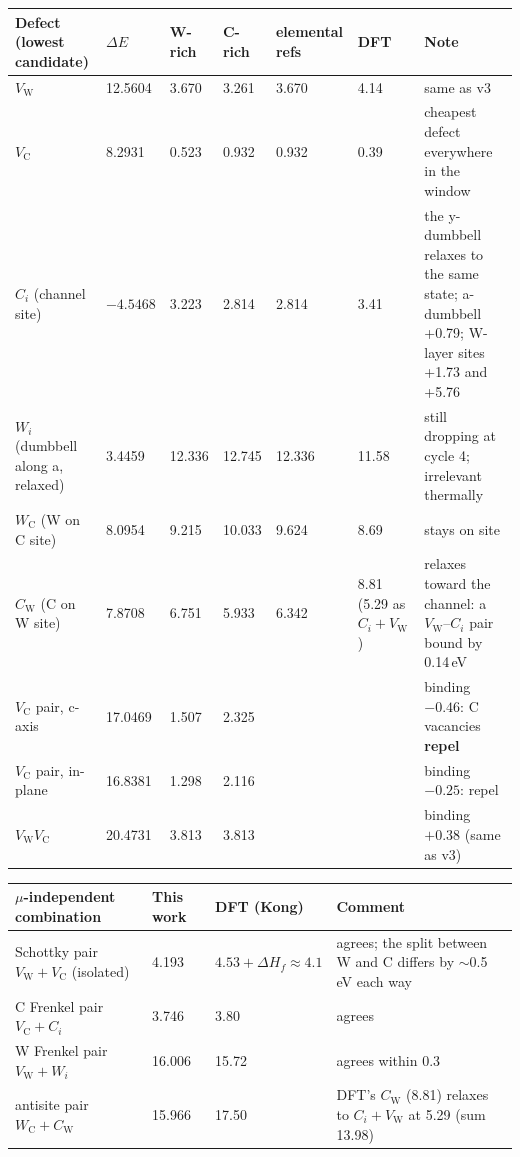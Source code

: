 \documentclass[10pt]{article}
\begin{document}
\begin{xltabular}{\linewidth}{L{3.6cm} L{1.5cm} L{1.4cm} L{1.4cm} L{1.7cm} L{1.4cm} Y}
\toprule
\textbf{Defect (lowest candidate)} & $\Delta E$ & \textbf{W-rich} & \textbf{C-rich} & \textbf{elemental refs} & \textbf{DFT} & \textbf{Note} \\
\midrule\endhead
$V_\mathrm W$ & 12.5604 & 3.670 & 3.261 & 3.670 & 4.14 & same as v3 \\
$V_\mathrm C$ & 8.2931 & 0.523 & 0.932 & 0.932 & 0.39 & cheapest defect everywhere in the window \\
$C_i$ (channel site) & $-4.5468$ & 3.223 & 2.814 & 2.814 & 3.41 & the y-dumbbell relaxes to the same state; a-dumbbell +0.79; W-layer sites +1.73 and +5.76 \\
$W_i$ (dumbbell along a, relaxed) & 3.4459 & 12.336 & 12.745 & 12.336 & 11.58 & still dropping at cycle 4; irrelevant thermally \\
$W_\mathrm C$ (W on C site) & 8.0954 & 9.215 & 10.033 & 9.624 & 8.69 & stays on site \\
$C_\mathrm W$ (C on W site) & 7.8708 & 6.751 & 5.933 & 6.342 & 8.81 (5.29 as $C_i+V_\mathrm W$) & relaxes toward the channel: a $V_\mathrm W$--$C_i$ pair bound by 0.14\,eV \\
$V_\mathrm C$ pair, c-axis & 17.0469 & 1.507 & 2.325 & & & binding $-0.46$: C vacancies \textbf{repel} \\
$V_\mathrm C$ pair, in-plane & 16.8381 & 1.298 & 2.116 & & & binding $-0.25$: repel \\
$V_\mathrm W V_\mathrm C$ & 20.4731 & 3.813 & 3.813 & & & binding $+0.38$ (same as v3) \\
\bottomrule
\end{xltabular}

\begin{xltabular}{\linewidth}{L{5.2cm} L{2.2cm} L{2.6cm} Y}
\toprule
\textbf{$\mu$-independent combination} & \textbf{This work} & \textbf{DFT (Kong)} & \textbf{Comment} \\
\midrule\endhead
Schottky pair $V_\mathrm W + V_\mathrm C$ (isolated) & 4.193 & $4.53+\Delta H_f\approx4.1$ & agrees; the split between W and C differs by $\sim$0.5\,eV each way \\
C Frenkel pair $V_\mathrm C + C_i$ & 3.746 & 3.80 & agrees \\
W Frenkel pair $V_\mathrm W + W_i$ & 16.006 & 15.72 & agrees within 0.3 \\
antisite pair $W_\mathrm C + C_\mathrm W$ & 15.966 & 17.50 & DFT's $C_\mathrm W$ (8.81) relaxes to $C_i+V_\mathrm W$ at 5.29 (sum 13.98) \\
\bottomrule
\end{xltabular}
\end{document}

